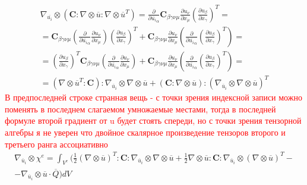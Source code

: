 \documentclass[a4paper,12pt]{article}
\begin{document}
\begin{equation}
    \begin{split}
        \nabla_{\overline{u_i}} \otimes( \textbf{C}:\nabla \otimes \overline{u} : \nabla \otimes \overline{u}^T) = \frac{\partial}{\partial \overline{u_i}_\alpha } \textbf{C}_{\beta \gamma \nu \mu} \frac{\partial u_\nu}{\partial x_\mu} (\frac{\partial u_\beta}{\partial x_\gamma})^T = \\ = \textbf{C}_{\beta \gamma \nu \mu} (\frac{\partial}{\partial \overline{u_i}_\alpha } \frac{\partial u_\nu}{\partial x_\mu}) (\frac{\partial u_\beta}{\partial x_\gamma})^T + \textbf{C}_{\beta \gamma \nu \mu} \frac{\partial u_\nu}{\partial x_\mu} (\frac{\partial}{\partial \overline{u_i}_\alpha } (\frac{\partial u_\beta}{\partial x_\gamma})^T) = \\ = (\frac{\partial u_\beta}{\partial x_\gamma})^T \textbf{C}_{\beta \gamma \nu \mu} (\frac{\partial}{\partial \overline{u_i}_\alpha } \frac{\partial u_\nu}{\partial x_\mu}) + \textbf{C}_{\beta \gamma \nu \mu} \frac{\partial u_\nu}{\partial x_\mu} (\frac{\partial}{\partial \overline{u_i}_\alpha } (\frac{\partial u_\beta}{\partial x_\gamma})^T) = \\ = 
        (\nabla \otimes \overline{u}^T:\textbf{C}) : \nabla_{\overline{u}_i} \otimes  \nabla \otimes \overline{u}  +  (\textbf{C}:\nabla \otimes \overline{u}) : (\nabla_{\overline{u}_i} \otimes  \nabla \otimes \overline{u})^T
    \end{split}
\end{equation}
\textcolor{red}{ В предпоследней строке странная вещь - с точки зрения индексной записи можно поменять в последнем слагаемом умножаемые местами, тогда в последней формуле второй градиент от u будет стоять спереди, но с точки зрения тензорной алгебры я не уверен что двойное скалярное произведение тензоров второго и третьего ранга ассоциативно}
\begin{equation}
\begin{split}
\nabla_{\overline{u}_i} \otimes \chi^e = \int_{V^e} \Bigg(\frac{1}{2} (\nabla \otimes \overline{u})^T:\textbf{C} : \nabla_{\overline{u}_i} \otimes  \nabla \otimes \overline{u} + \frac{1}{2} \nabla \otimes \overline{u}:\textbf{C}:\nabla_{\overline{u}_i} \otimes  (\nabla \otimes \overline{u})^T  - \\ - \nabla_{\overline{u}_i} \otimes\overline{u} \cdot \overline{Q}\Bigg) dV
\end{split}
\end{equation}
\end{document}
